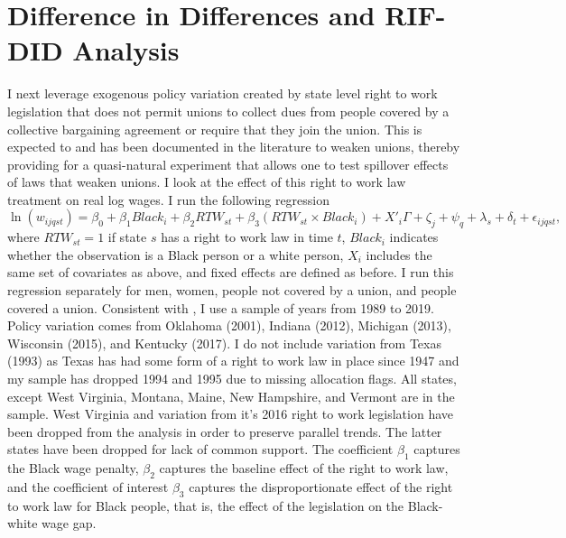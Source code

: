 \documentclass[11pt]{article}
\begin{document}
\section{Difference in Differences and RIF-DID Analysis}\label{sec:did}
I next leverage exogenous policy variation created by state level right to work legislation that does not permit unions to collect dues from people covered by a collective bargaining agreement or require that they join the union. This is expected to and has been documented in the literature to weaken unions, thereby providing for a quasi-natural experiment that allows one to test spillover effects of laws that weaken unions. I look at the effect of this right to work law treatment on real log wages. I run the following regression
\begin{equation}\label{eq:did}
\ln(w_{ijqst}) = \beta_0 + \beta_1Black_i + \beta_2RTW_{st} + \beta_3(RTW_{st}\times Black_i) + X'_i\Gamma +\zeta_j + \psi_q + \lambda_s + \delta_t + \epsilon_{ijqst},  
\end{equation}
where $RTW_{st} = 1$ if state $s$ has a right to work law in time $t$, $Black_i$ indicates whether the observation is a Black person or a white person, $X_i$ includes the same set of covariates as above, and fixed effects are defined as before. I run this regression separately for men, women, people not covered by a union, and people covered a union. Consistent with \cite{taschereau-dumouchel2020}, I use a sample of years from 1989 to 2019. Policy variation comes from Oklahoma (2001), Indiana (2012), Michigan (2013), Wisconsin (2015), and Kentucky (2017). I do not include variation from Texas (1993) as Texas has had some form of a right to work law in place since 1947 and my sample has dropped 1994 and 1995 due to missing allocation flags. All states, except West Virginia, Montana, Maine, New Hampshire, and Vermont are in the sample. West Virginia and variation from it's 2016 right to work legislation have been dropped from the analysis in order to preserve parallel trends. The latter states have been dropped for lack of common support. The coefficient $\beta_1$ captures the Black wage penalty, $\beta_2$ captures the baseline effect of the right to work law, and the coefficient of interest $\beta_3$ captures the disproportionate effect of the right to work law for Black people, that is, the effect of the legislation on the Black-white wage gap.
\end{document}
